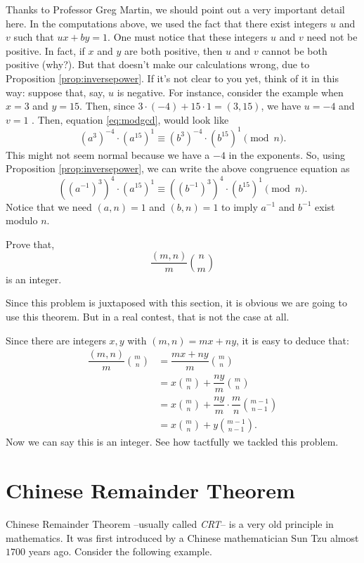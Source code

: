 \documentclass{subfile}
\begin{document}
\begin{remark}
		Thanks to Professor Greg Martin, we should point out a very important detail here. In the computations above, we used the fact that there exist integers $u$ and $v$ such that $ux+by = 1$. One must notice that these integers $u$ and $v$ need not be positive. In fact, if $x$ and $y$ are both positive, then $u$ and $v$ cannot be both positive (why?). But that doesn't make our calculations wrong, due to Proposition \ref{prop:inversepower}. If it's not clear to you yet, think of it in this way: suppose that, say, $u$ is negative. For instance, consider the example when $x=3$ and $y=15$. Then, since $3 \cdot (-4) + 15 \cdot 1 = (3,15)$, we have $u=-4$ and $v=1$ . Then, equation \eqref{eq:modgcd}, would look like $$(a^3)^{-4} \cdot (a^{15})^{1} \equiv (b^3)^{-4} \cdot (b^{15})^{1} \pmod n.$$
		This might not seem normal because we have a $-4$ in the exponents. So, using Proposition \ref{prop:inversepower}, we can write the above congruence equation as
		$$\left(\left(a^{-1}\right)^3\right)^{4} \cdot (a^{15})^{1} \equiv \left(\left(b^{-1}\right)^3\right)^{4} \cdot (b^{15})^{1} \pmod n.$$
		Notice that we need $(a,n)=1$ and $(b,n)=1$ to imply $a^{-1}$ and $b^{-1}$ exist modulo $n$.
\end{remark}
		
	\begin{problem}
		Prove that, $$\dfrac{(m,n)}{m}\binom{n}{m}$$ is an integer.
	\end{problem}
	Since this problem is juxtaposed with this section, it is obvious we are going to use this theorem. But in a real contest, that is not the case at all.
	\begin{solution}
		Since there are integers $x,y$ with $(m,n)=mx+ny$, it is easy to deduce that:
			\begin{align*}
			\dfrac{(m,n)}{m}\binom{m}{n} & = \dfrac{mx+ny}{m}\binom{m}{n}\\
			& = x\binom{m}{n}+\dfrac{ny}{m}\binom{m}{n}\\
			& = x\binom{m}{n}+\dfrac{ny}{m}\cdot\dfrac{m}{n}\binom{m-1}{n-1}\\
			& = x\binom{m}{n}+y\binom{m-1}{n-1}.
			\end{align*}
		Now we can say this is an integer. See how tactfully we tackled this problem.
	\end{solution}
	

\section{Chinese Remainder Theorem}	
	Chinese Remainder Theorem --usually called \textit{CRT}-- is a very old principle in mathematics. It was first introduced by a Chinese mathematician Sun Tzu almost $1700$ years ago. Consider the following example.
	
\end{document}
